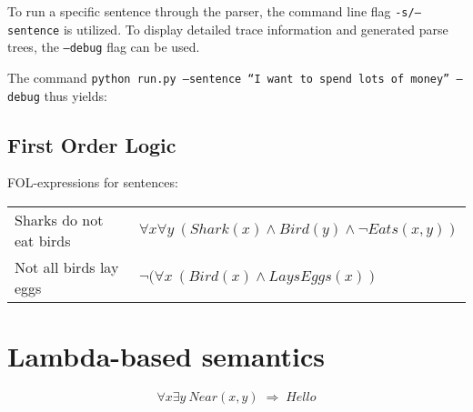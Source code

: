 \documentclass[11pt,a4paper]{article}
\begin{document}
        To run a specific sentence through the parser, the command line flag \texttt{-s/--sentence} is utilized.
        To display detailed trace information and generated parse trees, the \texttt{--debug} flag can be used.

        The command \texttt{python run.py --sentence ``I want to spend lots of money'' --debug} thus yields:

        {\footnotesize
          
        }



    \subsection{First Order Logic} %
    \label{sub:first_order_logic}

      FOL-expressions for sentences: \\

      \begin{tabular}{ll}
        Sharks do not eat birds & $ \forall x \forall y \: ( Shark(x) \land Bird(y) \land \neg Eats(x, y) ) $ \\
        Not all birds lay eggs & $ \neg ( \forall x \: ( Bird(x) \land LaysEggs(x) ) $ \\
      \end{tabular}



  \section{Lambda-based semantics} %
  \label{sec:lambda_based_semantics}

    \begin{equation}
      \forall x \exists y \: Near(x, y) \; \Rightarrow \; Hello
    \end{equation}

\end{document}
